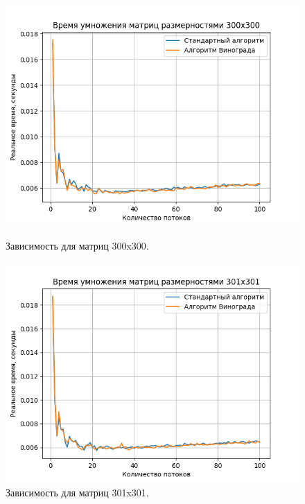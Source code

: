 \documentclass[a4paper,12pt]{article}
\begin{document}
\begin{figure}[H]
\begin{center}
\begin{minipage}[H]{0.48\linewidth}
\includegraphics[width=1\linewidth]{300x300.png}
\caption{Зависимость для матриц 300x300.}
\label{ris:experimoriginal}
\end{minipage}
\hfill
\begin{minipage}[H]{0.48\linewidth}
\includegraphics[width=1\linewidth]{301x301.png}
\caption{Зависимость для матриц 301x301.}
\label{ris:experimcoded}
\end{minipage}
\end{center}
\begin{center}
\begin{minipage}[H]{0.48\linewidth}

\end{minipage}
\end{center}
\end{figure}
\end{document}
